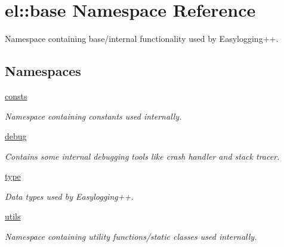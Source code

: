 \hypertarget{namespaceel_1_1base}{}\section{el\+:\+:base Namespace Reference}
\label{namespaceel_1_1base}


Namespace containing base/internal functionality used by Easylogging++.  


\subsection*{Namespaces}
\begin{DoxyCompactItemize}
\item 
 \hyperlink{namespaceel_1_1base_1_1consts}{consts}
\begin{DoxyCompactList}\small\item\em Namespace containing constants used internally. \end{DoxyCompactList}\item 
 \hyperlink{namespaceel_1_1base_1_1debug}{debug}
\begin{DoxyCompactList}\small\item\em Contains some internal debugging tools like crash handler and stack tracer. \end{DoxyCompactList}\item 
 \hyperlink{namespaceel_1_1base_1_1type}{type}
\begin{DoxyCompactList}\small\item\em Data types used by Easylogging++. \end{DoxyCompactList}\item 
 \hyperlink{namespaceel_1_1base_1_1utils}{utils}
\begin{DoxyCompactList}\small\item\em Namespace containing utility functions/static classes used internally. \end{DoxyCompactList}\end{DoxyCompactItemize}
